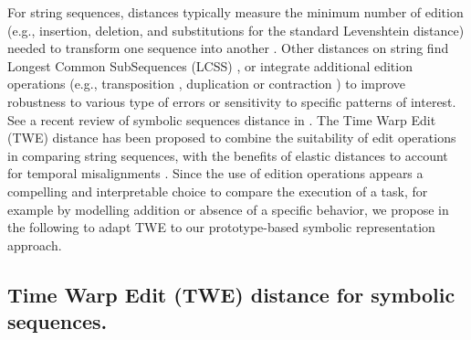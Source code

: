 \begin{chapterabstract}
    For string sequences, distances typically measure the minimum number of edition (e.g., insertion, deletion, and substitutions for the standard Levenshtein distance) needed to transform one sequence into another \cite{combettes_these}. Other distances on string find Longest Common SubSequences (LCSS) \cite{Hirschberg1977, Needleman1970}, or integrate additional edition operations (e.g., transposition \cite{Damerau1964}, duplication or contraction \cite{Pinhas2013}) to improve robustness to various type of errors or sensitivity to specific patterns of interest. See a recent review of symbolic sequences distance in \cite{combettes_these}. The Time Warp Edit (TWE) distance has been proposed to combine the suitability of edit operations in comparing string sequences, with the benefits of elastic distances to account for temporal misalignments \cite{Marteau2009}. Since the use of edition operations appears a compelling and interpretable choice to compare the execution of a task, for example by modelling addition or absence of a specific behavior, we propose in the following to adapt TWE to our prototype-based symbolic representation approach. 

    \subsection{Time Warp Edit (TWE) distance for symbolic sequences.}


\end{chapterabstract}
